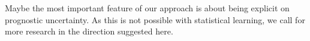 \documentclass{article}
\begin{document}
Maybe the most important feature of our approach is about being explicit on prognostic uncertainty. As this is not possible with statistical learning, we call for more research in the direction suggested here.









\end{document}
